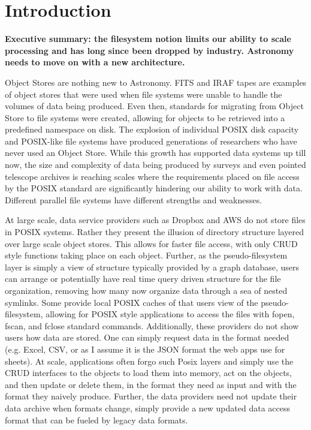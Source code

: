 
\section{Introduction} \label{sec:intro}

{\bf Executive summary: the filesystem notion limits our ability to scale processing and has long since been dropped by industry. Astronomy needs to move on with a new architecture.}

Object Stores are nothing new to Astronomy.  \gls{FITS} and \gls{IRAF} tapes are examples
of object stores that were used when file systems were unable to handle the volumes
of data being produced. Even then, standards for migrating from Object Store to file
systems were created, allowing for objects to be retrieved into a predefined namespace
on disk.  The explosion of individual \gls{POSIX} disk capacity and \gls{POSIX}-like file systems
have produced generations of researchers who have never used an Object Store. While
this growth has supported data systems up till now, the size and complexity of
data being produced by surveys and even pointed telescope archives is reaching
scales where the requirements placed on file access by the \gls{POSIX} standard are
significantly hindering our ability to work with data.  Different parallel file systems
have different strengths and weaknesses.

At large scale, data service providers such as Dropbox and \gls{AWS} do not store files
in \gls{POSIX} systems.  Rather they present the illusion of directory structure layered over
large scale object stores. This allows for faster file access, with only \gls{CRUD} style
functions taking place on each object.  Further, as the pseudo-filesystem layer is simply a
view of structure typically provided by a graph database, users can arrange or potentially
have real time query driven structure for the file organization, removing how many now
organize data through a sea of nested symlinks.
Some provide local \gls{POSIX} caches of that users view of the
pseudo-filesystem, allowing for \gls{POSIX} style applications to access the files with
fopen, fscan, and fclose standard commands. Additionally, these providers do
not show users how data are stored. One can simply request data in the format
needed (e.g. Excel, \gls{CSV}, or as I assume it is the \gls{JSON} format the web apps
use for sheets).   At scale, applications often forgo
such Posix layers and simply use the \gls{CRUD} interfaces to the objects to load them into
memory, act on the objects, and then update or delete them, in the format they need
as input and with the format they naively produce. Further, the data providers need
not update their data archive when formats change, simply provide a new updated
data access format that can be fueled by legacy data formats.

